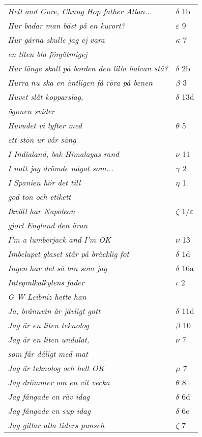 \documentclass[a6paper,10pt]{article}
\begin{document}
\newpage
\setlength{\oddsidemargin}{-0.47in}
\begin{table}[!h]
\begin{tabular}{l l}
\textit{Hell and Gore, Chung Hop father Allan...}	&$\delta$ 1b\\
\textit{Hur badar man bäst på en kurort?}	&$\varepsilon$ 9\\
\textit{Hur gärna skulle jag ej vara}	&$\kappa$ 7\\
\textit{en liten blå förgätmigej} &\\
\textit{Hur länge skall på borden den lilla halvan stå?}	&$\delta$ 2b\\
\textit{Hurra nu ska en äntligen få röra på benen}	&$\beta$ 3\\
\textit{Huvet slåt kopparslag,}	&$\delta$ 13d\\
\textit{ögonen svider} &\\
\textit{Huvudet vi lyfter med}	&$\theta$ 5\\
\textit{ett stön ur vår säng} &\\
\textit{I Indialand, bak Himalayas rand}	&$\nu$ 11\\
\textit{I natt jag drömde något som...}	&$\gamma$ 2\\
\textit{I Spanien hör det till}	&$\eta$ 1\\
\textit{god ton och etikett} &\\
\textit{Ikväll har Napoleon}	&$\zeta$ 1/$\varepsilon$\\
\textit{gjort England den äran} &\\
\textit{I'm a lumberjack and I'm OK}	&$\nu$ 13\\
\textit{Imbelupet glaset står på bräcklig fot}	&$\delta$ 1d\\
\textit{Ingen har det så bra som jag}	&$\delta$ 16a\\
\textit{Integralkalkylens fader}	&$\iota$ 2\\
\textit{G W Leibniz hette han} &\\
\textit{Ja, brännvin är jävligt gott}	&$\delta$ 11d\\
\textit{Jag är en liten teknolog}	&$\beta$ 10\\
\textit{Jag är en liten undulat,}	&$\nu$ 7\\
\textit{som får dåligt med mat} &\\
\textit{Jag är teknolog och helt OK}	&$\mu$ 7\\
\textit{Jag drömmer om en vit vecka}	&$\theta$ 8\\
\textit{Jag fångade en räv idag}	&$\delta$ 6d\\
\textit{Jag fångade en sup idag}	&$\delta$ 6e\\
\textit{Jag gillar alla tiders punsch}	&$\zeta$ 7\\
\end{tabular}
\end{table}
\end{document}
